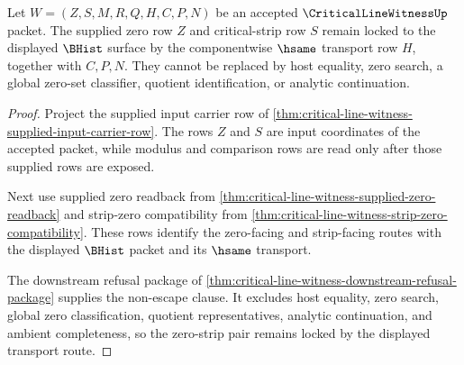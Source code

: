 \begin{theorem}
\label{thm:critical-line-witness-supplied-zero-strip-transport-lock}
Let $W=(Z,S,M,R,Q,H,C,P,N)$ be an accepted $\CriticalLineWitnessUp$ packet. The supplied zero row $Z$ and critical-strip row $S$ remain locked to the displayed $\BHist$ surface by the componentwise $\hsame$ transport row $H$, together with $C,P,N$. They cannot be replaced by host equality, zero search, a global zero-set classifier, quotient identification, or analytic continuation.
\end{theorem}
\begin{proof}
Project the supplied input carrier row of \autoref{thm:critical-line-witness-supplied-input-carrier-row}. The rows $Z$ and $S$ are input coordinates of the accepted packet, while modulus and comparison rows are read only after those supplied rows are exposed.

Next use supplied zero readback from \autoref{thm:critical-line-witness-supplied-zero-readback} and strip-zero compatibility from \autoref{thm:critical-line-witness-strip-zero-compatibility}. These rows identify the zero-facing and strip-facing routes with the displayed $\BHist$ packet and its $\hsame$ transport.

The downstream refusal package of \autoref{thm:critical-line-witness-downstream-refusal-package} supplies the non-escape clause. It excludes host equality, zero search, global zero classification, quotient representatives, analytic continuation, and ambient completeness, so the zero-strip pair remains locked by the displayed transport route.
\end{proof}

